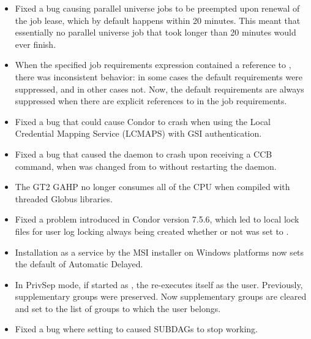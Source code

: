 \begin{itemize}

\item Fixed a bug causing parallel universe jobs to be preempted upon 
renewal of the job lease, 
which by default happens within 20 minutes. 
This meant that essentially no parallel universe job that took
longer than 20 minutes would ever finish.

\item When the specified job requirements expression contained a
reference to , there was inconsistent behavior:
in some cases the default  requirements were
suppressed, and in other cases not.  Now, the default
 requirements are always suppressed when there
are explicit references to  in the job
requirements.

\item Fixed a bug that could cause Condor to crash when using 
the Local Credential Mapping Service (LCMAPS) with
GSI authentication.

\item Fixed a bug that caused the  daemon to crash
upon receiving a CCB command,
when  was changed from  to 
without restarting the daemon.

\item The GT2 GAHP no longer consumes all of the CPU when compiled
with threaded Globus libraries.

\item Fixed a problem introduced in Condor version 7.5.6, 
which led to local lock files for user log locking always being created 
whether or 
not  was set to .

\item Installation as a service by the MSI installer on Windows platforms 
now sets the default of Automatic Delayed.

\item In PrivSep mode, if started as , 
the  re-executes itself as the  user.
Previously, supplementary groups were preserved.
Now supplementary groups are cleared and set to the list of groups
to which the  user belongs.

\item Fixed a bug where setting  to
 caused SUBDAGs to stop working.


\end{itemize}

